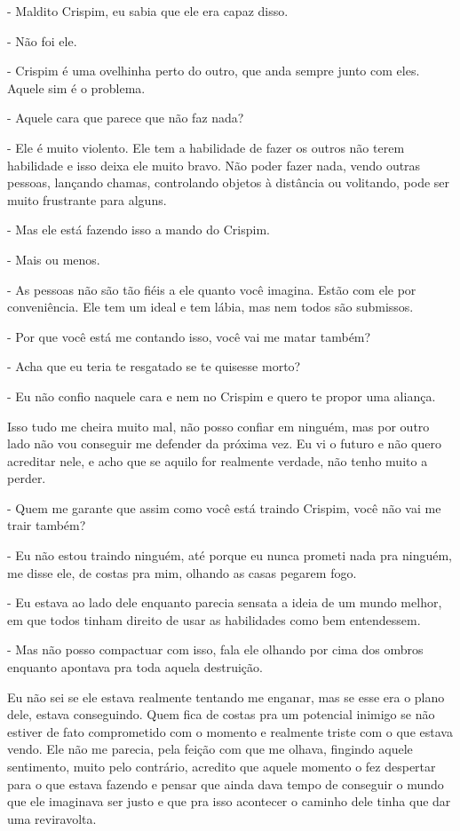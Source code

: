 - Maldito Crispim, eu sabia que ele era capaz disso.

- Não foi ele.

- Crispim é uma ovelhinha perto do outro, que anda sempre junto com eles. Aquele sim é o problema.

- Aquele cara que parece que não faz nada?

- Ele é muito violento. Ele tem a habilidade de fazer os outros não terem habilidade e isso deixa ele muito bravo. Não poder fazer nada, vendo outras pessoas, lançando chamas, controlando objetos à distância ou volitando, pode ser muito frustrante para alguns.

- Mas ele está fazendo isso a mando do Crispim.

- Mais ou menos.

- As pessoas não são tão fiéis a ele quanto você imagina. Estão com ele por conveniência. Ele tem um ideal e tem lábia, mas nem todos são submissos.

- Por que você está me contando isso, você vai me matar também?

- Acha que eu teria te resgatado se te quisesse morto?

- Eu não confio naquele cara e nem no Crispim e quero te propor uma aliança.

Isso tudo me cheira muito mal, não posso confiar em ninguém, mas por outro lado não vou conseguir me defender da próxima vez. Eu vi o futuro e não quero acreditar nele, e acho que se aquilo for realmente verdade, não tenho muito a perder.

- Quem me garante que assim como você está traindo Crispim, você não vai me trair também?

- Eu não estou traindo ninguém, até porque eu nunca prometi nada pra ninguém, me disse ele, de costas pra mim, olhando as casas pegarem fogo.

- Eu estava ao lado dele enquanto parecia sensata a ideia de um mundo melhor, em que todos tinham direito de usar as habilidades como bem entendessem.

- Mas não posso compactuar com isso, fala ele olhando por cima dos ombros enquanto apontava pra toda aquela destruição.

Eu não sei se ele estava realmente tentando me enganar, mas se esse era o plano dele, estava conseguindo. Quem fica de costas pra um potencial inimigo se não estiver de fato comprometido com o momento e realmente triste com o que estava vendo. Ele não me parecia, pela feição com que me olhava, fingindo aquele sentimento, muito pelo contrário, acredito que aquele momento o fez despertar para o que estava fazendo e pensar que ainda dava tempo de conseguir o mundo que ele imaginava ser justo e que pra isso acontecer o caminho dele tinha que dar uma reviravolta.

